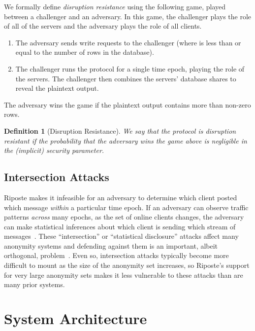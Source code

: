 \documentclass[10pt,twocolumn]{article}
\newtheorem{defn}{Definition}
\newcommand{\name}{Riposte\xspace}
\newcommand{\Name}{Riposte\xspace}
\begin{document}
We formally define {\em disruption resistance} using
the following game, played between a challenger
and an adversary.
In this game, the challenger plays the role of
all of the servers and the adversary plays the 
role of all clients.
\begin{enumerate}
  \item The adversary sends  write requests
    to the challenger
    (where  is less than or equal to the number of 
    rows in the database).
  \item The challenger runs the protocol for
    a single time epoch, playing the role of the servers.
    The challenger then combines the servers' database
    shares to reveal the plaintext output.
\end{enumerate}

The adversary wins the game if the plaintext
output contains more than  non-zero rows. 

\begin{defn}[Disruption Resistance]
We say that the protocol is {\em disruption resistant}
if the probability that the adversary wins the game
above is negligible in the (implicit) security parameter.
\end{defn}

\subsection{Intersection Attacks}

\Name makes it infeasible for an adversary to determine
which client posted which message {\em within} a particular time epoch.
If an adversary can observe traffic patterns {\em across} many
epochs, as the set of online clients changes, the adversary can
make statistical inferences about which client is sending 
which stream of 
messages~\cite{danezis2004statistical,kedogan2003limits,mathewson2005practical}.
These ``intersection'' or ``statistical disclosure'' attacks
affect many anonymity systems and defending against them is an important,
albeit orthogonal, problem~\cite{mathewson2005practical,wolinsky2013hang}.
Even so, intersection attacks typically become more difficult to
mount as the size of the anonymity set increases, so \name's support for
very large anonymity sets makes it less vulnerable to these attacks than 
are many prior systems. 


 \section{System Architecture}
\label{sec:arch}
\end{document}
